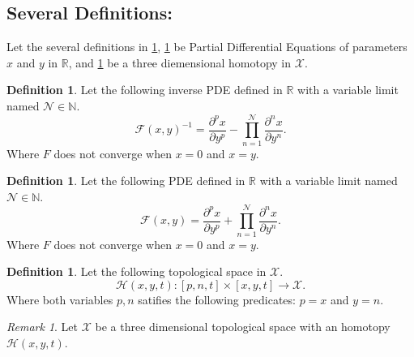 \documentclass[10pt]{article}
\theoremstyle{plain}
\theoremstyle{definition}
\newtheorem{definition}[theorem]{Definition}
\theoremstyle{remark}
\newtheorem{remark}[theorem]{Remark}
\begin{document}
\subsection{Several Definitions:}

Let the several definitions in \ref{def:1}, \ref{def:2} be Partial Differential Equations of parameters $x$ and $y$ in $\mathbb{R}$, and \ref{def:3} be a three diemensional homotopy in $\mathcal{X}$.

\begin{definition}
\label{def:1}
Let the following inverse PDE defined in $\mathbb{R}$ with a variable limit named $\mathcal{N} \in \mathbb{N}$.
\begin{equation}
	\mathcal{F}(x, y)^{-1} = \frac{\partial^p x}{ \partial y^p} - \prod_{n=1}^{\mathcal{N}} \frac{\partial^n x}{ \partial y^n}. 
\end{equation}
Where $F$ does not converge when $x=0$ and $x=y$.
\end{definition}

\begin{definition}
\label{def:2}
Let the following PDE defined in $\mathbb{R}$ with a variable limit named $\mathcal{N} \in \mathbb{N}$.
\begin{equation}
	\mathcal{F}(x, y) = \frac{\partial^p x}{ \partial y^p} + \prod_{n=1}^{\mathcal{N}} \frac{\partial^n x}{ \partial y^n}. 
\end{equation}
Where $F$ does not converge when $x=0$ and $x=y$.
\end{definition}

\begin{definition}
\label{def:3}
Let the following topological space in $\mathcal{X}$.
\begin{equation}
	\mathcal{H}(x, y, t) : [p, n, t] \times [x, y, t] \to \mathcal{X}.
\end{equation}
Where both variables $p, n$ satifies the following predicates: $p=x$ and $y=n$.
\end{definition}

\begin{remark}
\label{rem:3.1}
	Let $\mathcal{X}$ be a three dimensional topological space with an homotopy $\mathcal{H}(x, y, t)$.
\end{remark}

\end{document}
